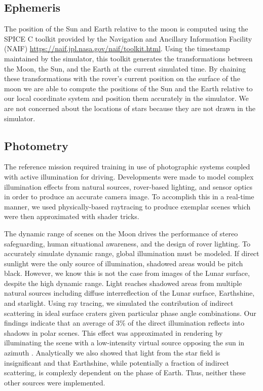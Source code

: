 \documentclass[twocolumn,letterpaper]{IEEEAerospaceCLS}  %
\begin{document}
\subsection{Ephemeris}
The position of the Sun and Earth relative to the moon is computed using the SPICE C toolkit provided by the Navigation and Ancillary Information Facility (NAIF) \url{https://naif.jpl.nasa.gov/naif/toolkit.html}.  Using the timestamp maintained by the simulator, this toolkit generates the transformations between the Moon, the Sun, and the Earth at the current simulated time.  By chaining these transformations with the rover's current position on the surface of the moon we are able to compute the positions of the Sun and the Earth relative to our local coordinate system and position them accurately in the simulator.  We are not concerned about the locations of stars because they are not drawn in the simulator.

\subsection {Photometry}
The reference mission required training in use of photographic systems coupled with active illumination for driving. Developments were made to model complex illumination effects from natural sources, rover-based lighting, and sensor optics in order to produce an accurate camera image. To accomplish this in a real-time manner, we used physically-based raytracing to produce exemplar scenes which were then approximated with shader tricks. 

The dynamic range of scenes on the Moon drives the performance of stereo safeguarding, human situational awareness, and the design of rover lighting. To accurately simulate dynamic range, global illumination must be modeled. If direct sunlight were the only source of illumination, shadowed areas would be pitch black. However, we know this is not the case from images of the Lunar surface, despite the high dynamic range. Light reaches shadowed areas from multiple natural sources including diffuse interreflection of the Lunar surface, Earthshine, and starlight. Using ray tracing, we simulated the contribution of indirect scattering in ideal surface craters given particular phase angle combinations. Our findings indicate that an average of 3\% of the direct illumination reflects into shadows in polar scenes. This effect was approximated in rendering by illuminating the scene with a low-intensity virtual source opposing the sun in azimuth . Analytically we also showed that light from the star field is insignificant and that Earthshine, while potentially a fraction of indirect scattering, is complexly dependent on the phase of Earth. Thus, neither these other sources were implemented.       
\end{document}
